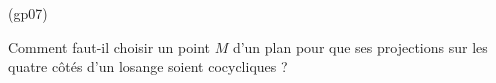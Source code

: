 \begin{tiny}(gp07)\end{tiny}
Comment faut-il choisir un point $M$ d'un plan pour que ses projections sur les quatre c{\^o}t{\'e}s d'un losange soient
cocycliques ?
